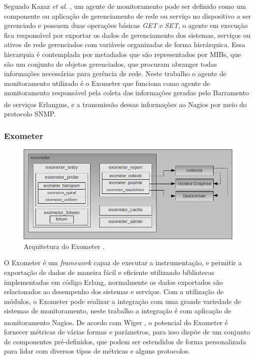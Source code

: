  Segundo Kazaz \textit{et al.} \cite{6240708}, um agente de monitoramento pode ser definido como um componente ou aplicação de gerenciamento de rede ou serviço no dispositivo a ser gerenciado e possuem duas operações básicas \textit{GET} e \textit{SET}, o agente em execução fica responsável por exportar os dados de gerenciamento dos sistemas, serviços ou ativos de rede gerenciados com variáveis organizadas de forma hierárquica. Essa hierarquia é contemplada por metadados que são representados por \acrshort{MIBs}, que são um conjunto de objetos gerenciados, que procuram abranger todas informações necessárias para gerência de rede. Neste trabalho o agente de monitoramento utilizado é o Exometer que funciona como agente de monitoramento responsável pela coleta das informações geradas pelo Barramento de serviços Erlangms, e a transmissão dessas informações ao Nagios\textsuperscript{\textregistered} por meio do protocolo \acrshort{SNMP}. 


\subsubsection{Exometer}

\begin{figure}[H]
	\begin{center}
	\includegraphics[scale = 0.60]{img/exometer_overview.png}
		\caption{Arquitetura do Exometer \cite{exometer_core}.}
		\label{fun:fig:zabbix}
	\end{center}
\end{figure}
O Exometer é um \textit{framework} capaz de executar a instrumentação, e permitir a exportação de dados de maneira fácil e eficiente utilizando bibliotecas implementadas em código Erlang, normalmente os dados exportados são relacionados ao desempenho dos sistemas e serviços. Com a utilização de módulos, o Exometer pode realizar a integração com uma grande variedade de sistemas de monitoramento, neste trabalho a integração é com aplicação de monitoramento Nagios\textsuperscript{\textregistered}. De acordo com Wiger \cite{exometer_core}, o potencial do Exometer é fornecer métricas de várias formas e parâmetros, para isso dispõe de um conjunto de componentes pré-definidos, que podem ser estendidos de forma personalizada para lidar com diversos tipos de métricas e alguns protocolos.

